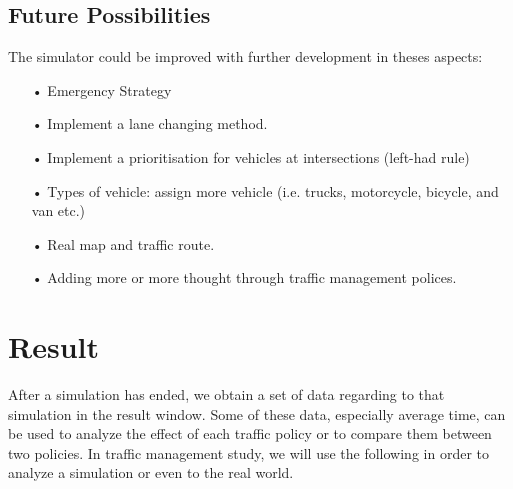 \documentclass[11pt]{article}
\begin{document}
\subsection{Future Possibilities}
The simulator could be improved with further development in theses aspects: 
\begin{itemize}
\item[•] Emergency Strategy
\item[•] Implement a lane changing method.
\item[•] Implement a prioritisation for vehicles at intersections (left-had rule)
\item[•] Types of vehicle: assign more vehicle (i.e. trucks, motorcycle, bicycle, and van etc.)
\item[•] Real map and traffic route.
\item[•] Adding more or more thought through traffic management polices. 
\end{itemize}


\newpage


\section{Result}
After a simulation has ended, we obtain a set of data regarding to that simulation in the result window. Some of these data, especially average time, can be used to analyze the effect of each traffic policy or to compare them between two policies. In traffic management study, we will use the following in order to analyze a simulation or even to the real world.
\end{document}
